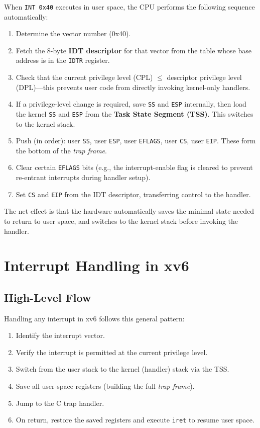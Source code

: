 \documentclass[11pt]{article}
\begin{document}
When \texttt{INT 0x40} executes in user space, the CPU performs the following sequence automatically:
\begin{enumerate}
    \item Determine the vector number (0x40).
    \item Fetch the 8-byte \textbf{IDT descriptor} for that vector from the table whose base address is in the \texttt{IDTR} register.
    \item Check that the current privilege level (CPL) $\leq$ descriptor privilege level (DPL)---this prevents user code from directly invoking kernel-only handlers.
    \item If a privilege-level change is required, save \texttt{SS} and \texttt{ESP} internally, then load the kernel \texttt{SS} and \texttt{ESP} from the \textbf{Task State Segment (TSS)}. This switches to the kernel stack.
    \item Push (in order): user \texttt{SS}, user \texttt{ESP}, user \texttt{EFLAGS}, user \texttt{CS}, user \texttt{EIP}. These form the bottom of the \emph{trap frame}.
    \item Clear certain \texttt{EFLAGS} bits (e.g., the interrupt-enable flag is cleared to prevent re-entrant interrupts during handler setup).
    \item Set \texttt{CS} and \texttt{EIP} from the IDT descriptor, transferring control to the handler.
\end{enumerate}

The net effect is that the hardware automatically saves the minimal state needed to return to user space, and switches to the kernel stack before invoking the handler.

\section{Interrupt Handling in xv6}

\subsection{High-Level Flow}

Handling any interrupt in xv6 follows this general pattern:
\begin{enumerate}
    \item Identify the interrupt vector.
    \item Verify the interrupt is permitted at the current privilege level.
    \item Switch from the user stack to the kernel (handler) stack via the TSS.
    \item Save all user-space registers (building the full \emph{trap frame}).
    \item Jump to the C trap handler.
    \item On return, restore the saved registers and execute \texttt{iret} to resume user space.
\end{enumerate}
\end{document}
